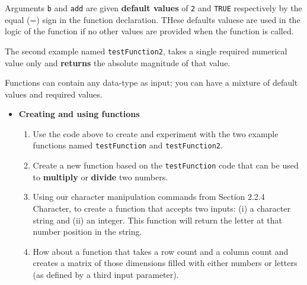 \documentclass[a4paper]{book}
\newenvironment{rmdblock}[1]
  {\vspace{1.5em}\begin{shaded*}
  \begin{itemize}
  \renewcommand{\labelitemi}{
    \raisebox{-.7\height}[0pt][0pt]{
      {\setkeys{Gin}{width=3em,keepaspectratio}\texttt{[image: images/\#1]}}
    }
  }
  \item
  }
  {
  \end{itemize}
  \end{shaded*}
  }
\newenvironment{rmdexercise}
  {\begin{rmdblock}{exercise}}
  {\end{rmdblock}}
\begin{document}
Arguments \texttt{b} and \texttt{add} are given \textbf{default values}
of \texttt{2} and \texttt{TRUE} respectively by the equal (=) sign in
the function declaration. THese defaults valuese are used in the logic
of the function if no other values are provided when the function is
called.

The second example named \texttt{testFunction2}, takes a single required
numerical value only and \textbf{returns} the absolute magnitude of that
value.

Functions can contain any data-type as input; you can have a mixture of
default values and required values.

\begin{rmdexercise}
\textbf{Creating and using functions}

\begin{enumerate}
\def\labelenumi{\arabic{enumi}.}
\item
  Use the code above to create and experiment with the two example
  functions named \texttt{testFunction} and \texttt{testFunction2}.
\item
  Create a new function based on the \texttt{testFunction} code that can
  be used to \textbf{multiply} or \textbf{divide} two numbers.
\item
  Using our character manipulation commands from Section 2.2.4
  Character, to create a function that accepts two inputs: (i) a
  character string and (ii) an integer. This function will return the
  letter at that number position in the string.
\item
  How about a function that takes a row count and a column count and
  creates a matrix of those dimensions filled with either numbers or
  letters (as defined by a third input parameter).
\end{enumerate}
\end{rmdexercise}
\end{document}
